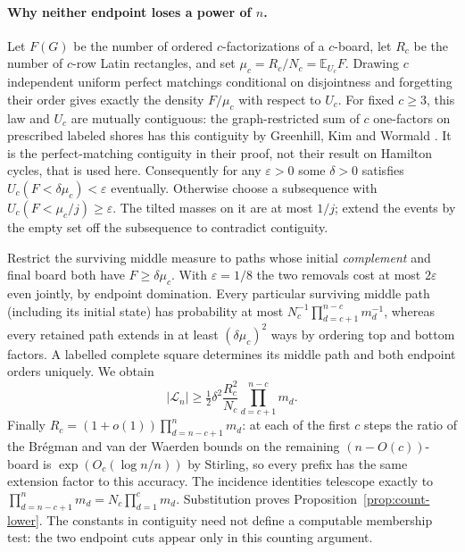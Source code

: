 \paragraph{Why neither endpoint loses a power of $n$.}
Let $F(G)$ be the number of ordered $c$-factorizations of a $c$-board,
let $R_c$ be the number of $c$-row Latin rectangles, and set
$\mu_c=R_c/N_c=\mathbb E_{U_c}F$. Drawing $c$ independent uniform
perfect matchings conditional on disjointness and forgetting their order
gives exactly the density $F/\mu_c$ with respect to $U_c$. For fixed
$c\ge3$, this law and $U_c$ are mutually contiguous:
the graph-restricted sum of $c$ one-factors on prescribed labeled shores has this contiguity by Greenhill, Kim and Wormald \cite[proof of Corollary~1.1, equation~(1)]{GKW}. It is the perfect-matching contiguity in their proof, not their result on Hamilton cycles, that is used here.
Consequently for any $\varepsilon>0$ some $\delta>0$ satisfies
$U_c(F<\delta\mu_c)<\varepsilon$ eventually. Otherwise choose a
subsequence with $U_c(F<\mu_c/j)\ge\varepsilon$. The tilted masses
on it are at most $1/j$; extend the events by the empty set off the
subsequence to contradict contiguity.

Restrict the surviving middle measure to paths whose initial
\emph{complement} and final board both have $F\ge\delta\mu_c$.
With $\varepsilon=1/8$ the two removals cost at most $2\varepsilon$
even jointly, by endpoint domination. Every particular surviving
middle path (including its initial state) has probability at most
$N_c^{-1}\prod_{d=c+1}^{n-c}m_d^{-1}$, whereas every retained path
extends in at least $(\delta\mu_c)^2$ ways by ordering top and bottom
factors. A labelled complete square determines its middle path and
both endpoint orders uniquely. We obtain
\[
 |\mathcal L_n|\ge \tfrac12\delta^2\frac{R_c^2}{N_c}
                   \prod_{d=c+1}^{n-c}m_d .
\]
Finally $R_c=(1+o(1))\prod_{d=n-c+1}^n m_d$: at each of the first
$c$ steps the ratio of the Br\'egman and van der Waerden bounds on the
remaining $(n-O(c))$-board is $\exp(O_c(\log n/n))$ by Stirling,
so every prefix has the same extension factor to this accuracy.
The incidence identities telescope exactly to
$\prod_{d=n-c+1}^n m_d=N_c\prod_{d=1}^c m_d$.
Substitution proves Proposition~\ref{prop:count-lower}. The constants
in contiguity need not define a computable membership test: the two
endpoint cuts appear only in this counting argument.
